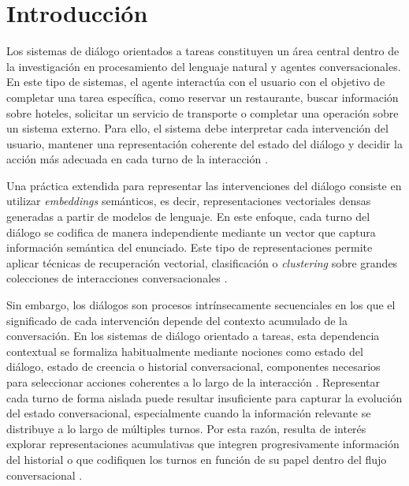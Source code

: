 \documentclass[runningheads]{llncs}
\begin{document}
\begin{abstract}
Estos resultados sugieren que la búsqueda aproximada de vecinos puede funcionar como un componente eficiente de memoria conversacional y que la utilidad de las representaciones acumulativas depende de la geometría del espacio base, especialmente cuando este se encuentra orientado a regularidades de flujos conversacionales.


\end{abstract}

\section{Introducción}

Los sistemas de diálogo orientados a tareas constituyen un área central dentro de la investigación en procesamiento del lenguaje natural y agentes conversacionales. En este tipo de sistemas, el agente interactúa con el usuario con el objetivo de completar una tarea específica, como reservar un restaurante, buscar información sobre hoteles, solicitar un servicio de transporte o completar una operación sobre un sistema externo. Para ello, el sistema debe interpretar cada intervención del usuario, mantener una representación coherente del estado del diálogo y decidir la acción más adecuada en cada turno de la interacción \cite{young2013pomdp,chen2017survey}.

Una práctica extendida para representar las intervenciones del diálogo consiste en utilizar \textit{embeddings} semánticos, es decir, representaciones vectoriales densas generadas a partir de modelos de lenguaje. En este enfoque, cada turno del diálogo se codifica de manera independiente mediante un vector que captura información semántica del enunciado. Este tipo de representaciones permite aplicar técnicas de recuperación vectorial, clasificación o \textit{clustering} sobre grandes colecciones de interacciones conversacionales \cite{devlin2019bert,reimers2019sentencebert}.

Sin embargo, los diálogos son procesos intrínsecamente secuenciales en los que el significado de cada intervención depende del contexto acumulado de la conversación. En los sistemas de diálogo orientado a tareas, esta dependencia contextual se formaliza habitualmente mediante nociones como estado del diálogo, estado de creencia o historial conversacional, componentes necesarios para seleccionar acciones coherentes a lo largo de la interacción \cite{young2013pomdp,williams2013pomdp,chen2017survey}. Representar cada turno de forma aislada puede resultar insuficiente para capturar la evolución del estado conversacional, especialmente cuando la información relevante se distribuye a lo largo de múltiples turnos. Por esta razón, resulta de interés explorar representaciones acumulativas que integren progresivamente información del historial o que codifiquen los turnos en función de su papel dentro del flujo conversacional \cite{wen2018sequence,min2020dialogue,hudecek2022latent,liu2023vls}.
\end{document}
